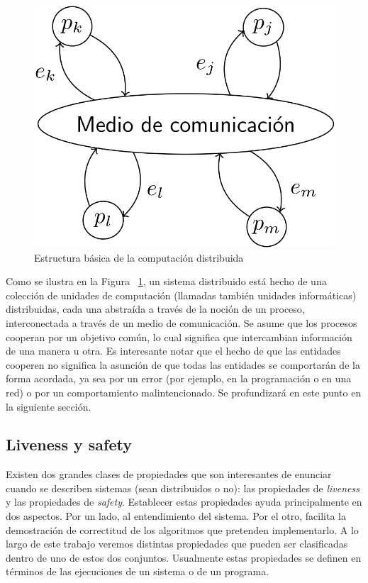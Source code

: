 \begin{figure}
  \centering
  \includegraphics[scale=0.18]{figures/distributed-systems.png}
  \caption{Estructura básica de la computación distribuida}
  \label{fig:distributed-systems}
\end{figure}


Como se ilustra en la Figura ~\ref{fig:distributed-systems}, un sistema distribuido está hecho de una
colección de unidades de computación (llamadas también unidades informáticas) distribuidas, cada una
abstraída a través de la noción de un proceso, interconectada a través de un medio de comunicación.
Se asume que los procesos cooperan por un objetivo común, lo cual significa que intercambian
información de una manera u otra. Es interesante notar que el hecho de que las entidades
cooperen no significa la asunción de que todas las entidades se comportarán de la forma
acordada, ya sea por un error (por ejemplo, en la programación o en una red) o por un comportamiento
malintencionado.
Se profundizará en este punto en la siguiente sección. %

\subsection{Liveness y safety}
Existen dos grandes clases de propiedades que son interesantes de enunciar cuando se describen sistemas
(sean distribuidos o no): las propiedades de \textit{liveness} y las propiedades de \textit{safety}.
Establecer estas propiedades ayuda principalmente en dos aspectos. Por un lado, al entendimiento del sistema.
Por el otro, facilita la demostración de correctitud de los algoritmos que pretenden implementarlo.
A lo largo de este trabajo veremos distintas propiedades que pueden ser clasificadas dentro
de uno de estos dos conjuntos.
Usualmente estas propiedades se definen en términos de las ejecuciones de un sistema o de un programa.

